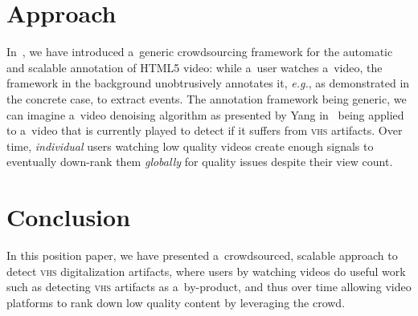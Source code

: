 \documentclass[runningheads,a4paper]{llncs}
\begin{document}
\vspace{-3em}

\section{Approach}

In~\cite{steiner2011crowdsourcing}, we have introduced
a~generic crowdsourcing framework for the automatic and scalable
annotation of HTML5 video:
while a~user watches a~video, the framework in the background
unobtrusively annotates it, \emph{e.g.}, as demonstrated
in the concrete case, to extract events.
The annotation framework being generic,
we can imagine a~video denoising algorithm
as presented by Yang in~\cite{yang2009videonoise}
being applied to a~video that is currently played
to detect if it suffers from {\scshape vhs} artifacts.
Over time, \emph{individual} users watching low quality videos
create enough signals to eventually down-rank them
\emph{globally} for quality issues despite their view count.

\vspace{-0.5em}

\section{Conclusion}

In this position paper, we have presented a~crowdsourced,
scalable approach to detect {\scshape vhs} digitalization artifacts,
where users by watching videos do useful work such as 
detecting {\scshape vhs} artifacts as a~by-product,
and thus over time allowing video platforms to rank down
low quality content by leveraging the crowd.

\vspace{-0.5em}

\footnotesize


\end{document}
